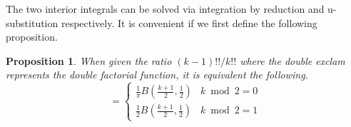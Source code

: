 \documentclass{article}
\newtheorem{proposition}{Proposition}
\begin{document}
The two interior integrals can be solved via integration by reduction and u-substitution respectively. It is convenient if we first define the following proposition.
\begin{proposition} \label{prop:double fac beta}
	When given the ratio $(k-1)!!/k!!$ where the double exclam represents the double factorial function, it is equivalent the following.
	\begin{equation}
		= \begin{cases}
			\frac{1}{\pi}B(\frac{k+1}{2}, \frac{1}{2}) & k\bmod 2=0\\
			\frac{1}{2}B(\frac{k+1}{2}, \frac{1}{2}) & k\bmod 2=1
		\end{cases}
	\end{equation}
\end{proposition}
\end{document}
